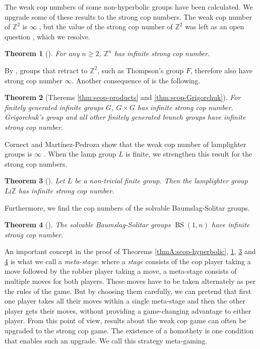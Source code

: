 \documentclass{amsart}
\newtheorem{theoremA}{Theorem}[section]
\theoremstyle{definition}
\theoremstyle{remark}
\theoremstyle{remark}
\theoremstyle{definition}
\newcommand{\Z}{\mathbb{Z}} %
\renewcommand{\geq}{\geqslant}
\begin{document}
The weak cop numbers of some non-hyperbolic groups have been calculated. We upgrade some of these results to the strong cop numbers. The weak cop number of $\mathbb{Z}^2$ is $\infty$ \cite[Theorem C]{LMR23}, but the value of the strong cop number of $\mathbb{Z}^2$ was left as an open question \cite[Question D]{LMR23}, which we resolve.
\begin{theoremA}[]\label{thmA:scop-Zn}
	For any \(n \geq 2\), \(\Z^n\) has infinite strong cop number.
\end{theoremA}
By \cite[Theorem E]{LMR23}, groups that retract to $\mathbb{Z}^2$, such as Thompson's group $F$, therefore also have strong cop number $\infty$. Another consequence of  is the following.
\begin{theoremA}[Therems \ref{thm:scop-products} and \ref{thm:scop-Grigorchuk}]\label{thmA:scop-Grigorchuk}
    For finitely generated infinite groups $G$, $G\times G$ has infinite strong cop number. Grigorchuk's group and all other finitely generated branch groups have infinite strong cop number.
\end{theoremA}
Cornect and Mart\'inez-Pedroza show that the weak cop number of lamplighter groups is $\infty$ \cite[Theorem 1.5]{CoMa24arxiv}. When the lamp group $L$ is finite, we strengthen this result for the strong cop numbers.
\begin{theoremA}[]\label{thmA:scop-lamplighter}
    Let \(L\) be a non-trivial finite group. Then the lamplighter group $L \wr \mathbb{Z}$ has infinite strong cop number.
\end{theoremA}
	
Furthermore, we find the cop numbers of the solvable Baumslag-Solitar groups.
\begin{theoremA}[]\label{thmA:scop-bs}
    The solvable Baumslag-Solitar groups $\operatorname{BS}(1,n)$ have infinite strong cop number.
\end{theoremA}
An important concept in the proof of Theorems \ref{thmA:scop-hyperbolic}, \ref{thmA:scop-Zn}, \ref{thmA:scop-lamplighter} and \ref{thmA:scop-bs} is what we call a \emph{meta-stage}:
where a \emph{stage} consists of the cop player taking a move followed by the robber player taking a move, a meta-stage consists of multiple moves for both players.
These moves have to be taken alternately as per the rules of the game.
But by choosing them carefully, we can pretend that first one player takes all their moves within a single meta-stage and then the other player gets their moves, without providing a game-changing advantage to either player. From this point of view, results about the weak cop game can often be upgraded to the strong cop game. The existence of a homothety is one condition that enables such an upgrade. We call this strategy meta-gaming.
\end{document}
